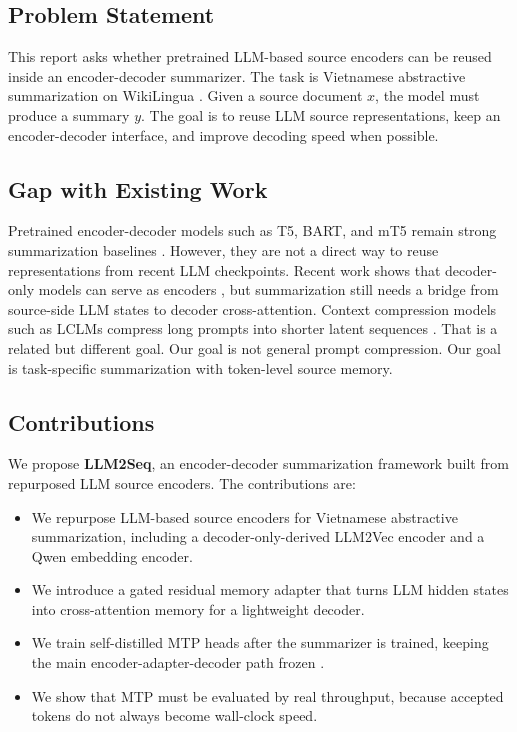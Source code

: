 \documentclass[11pt]{article}
\begin{document}
\subsection{Problem Statement}

This report asks whether pretrained LLM-based source encoders can be reused inside an encoder-decoder summarizer.
The task is Vietnamese abstractive summarization on WikiLingua \citep{ladhak2020wikilingua}.
Given a source document $x$, the model must produce a summary $y$.
The goal is to reuse LLM source representations, keep an encoder-decoder interface, and improve decoding speed when possible.

\subsection{Gap with Existing Work}

Pretrained encoder-decoder models such as T5, BART, and mT5 remain strong summarization baselines \citep{raffel2020t5,lewis2020bart,xue2021mt5}.
However, they are not a direct way to reuse representations from recent LLM checkpoints.
Recent work shows that decoder-only models can serve as encoders \citep{behnamghader2024llm2vec,luo2025lamate}, but summarization still needs a bridge from source-side LLM states to decoder cross-attention.
Context compression models such as LCLMs compress long prompts into shorter latent sequences \citep{li2026contextcompression}.
That is a related but different goal.
Our goal is not general prompt compression.
Our goal is task-specific summarization with token-level source memory.

\subsection{Contributions}

We propose \textbf{LLM2Seq}, an encoder-decoder summarization framework built from repurposed LLM source encoders.
The contributions are:
\begin{itemize}
    \item We repurpose LLM-based source encoders for Vietnamese abstractive summarization, including a decoder-only-derived LLM2Vec encoder and a Qwen embedding encoder.
    \item We introduce a gated residual memory adapter that turns LLM hidden states into cross-attention memory for a lightweight decoder.
    \item We train self-distilled MTP heads after the summarizer is trained, keeping the main encoder-adapter-decoder path frozen \citep{gloeckle2024mtp,zhao2026mtpdistill}.
    \item We show that MTP must be evaluated by real throughput, because accepted tokens do not always become wall-clock speed.
\end{itemize}
\end{document}
